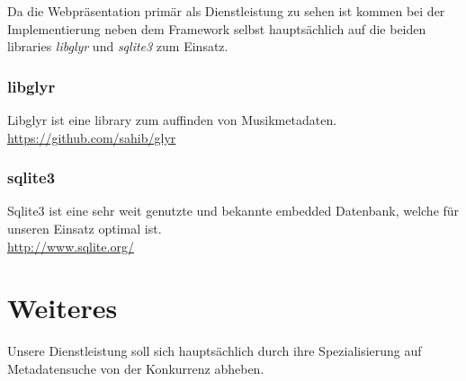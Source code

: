 \documentclass[11pt]{scrreprt}
\begin{document}
Da die Webpräsentation primär als Dienstleistung zu sehen ist kommen bei der
Implementierung neben dem Framework selbst hauptsächlich auf die beiden
libraries \emph{libglyr} und \emph{sqlite3} zum Einsatz.

\subsection{libglyr}
Libglyr ist eine library zum auffinden von Musikmetadaten. 
\\
\url{https://github.com/sahib/glyr}


\subsection{sqlite3}
Sqlite3 ist eine sehr weit genutzte und bekannte embedded Datenbank, welche für
unseren Einsatz optimal ist.
\\
\url{http://www.sqlite.org/}


\chapter{Weiteres}
Unsere Dienstleistung soll sich hauptsächlich durch ihre Spezialisierung auf
Metadatensuche von der Konkurrenz abheben. 
\end{document}
